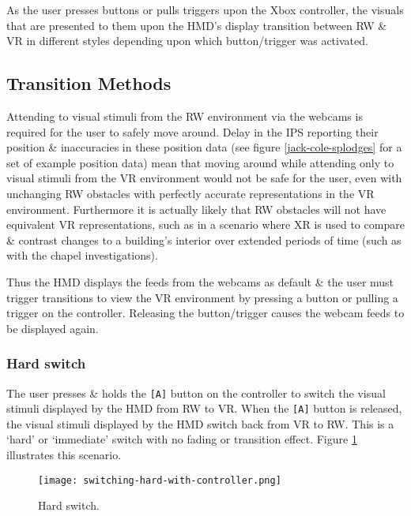 As the user presses buttons or pulls triggers upon the Xbox controller, the visuals that are presented to them upon the HMD's display transition between RW \& VR in different styles depending upon which button/trigger was activated.


\subsection{Transition Methods}
Attending to visual stimuli from the RW environment via the webcams is required for the user to safely move around. Delay in the IPS reporting their position \& inaccuracies in these position data (see figure \ref{jack-cole-splodges} for a set of example position data) mean that moving around while attending only to visual stimuli from the VR environment would not be safe for the user, even with unchanging RW obstacles with perfectly accurate representations in the VR environment. Furthermore it is actually likely that RW obstacles will not have equivalent VR representations, such as in a scenario where XR is used to compare \& contrast changes to a building's interior over extended periods of time (such as with the chapel investigations).

Thus the HMD displays the feeds from the webcams as default \& the user must trigger transitions to view the VR environment by pressing a button or pulling a trigger on the controller. Releasing the button/trigger causes the webcam feeds to be displayed again.


\subsubsection{Hard switch}
\label{sub-hardswitch}
The user presses \& holds the \texttt{[A]} button on the controller to switch the visual stimuli displayed by the HMD from RW to VR. When the \texttt{[A]} button is released, the visual stimuli displayed by the HMD switch back from VR to RW. This is a `hard' or `immediate' switch with no fading or transition effect. Figure \ref{scenario1} illustrates this scenario.

\begin{figure}[h]
	\begin{center}
		\texttt{[image: switching-hard-with-controller.png]}
		\caption{Hard switch.}
		\label{scenario1}
	\end{center}
\end{figure}

